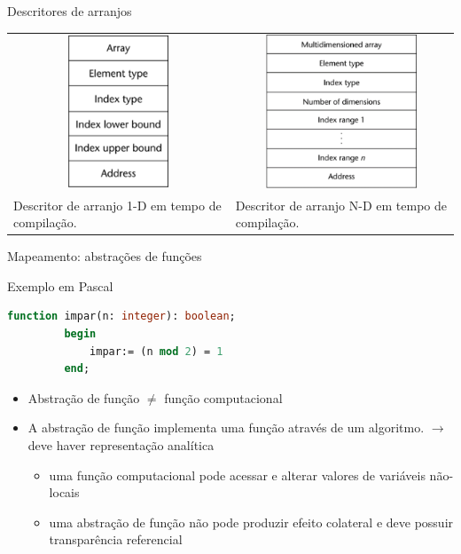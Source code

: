 \documentclass[handout]{beamer}
\begin{document}
\begin{frame}[fragile]{Descritores de arranjos}

\begin{center}
    \begin{tabular}{p{5cm}p{5cm}}
        \multicolumn{1}{c}{\includegraphics[width=3cm]{figuras/arranjo1d.pdf}}    &
        \multicolumn{1}{c}{\includegraphics[width=4.5cm]{figuras/arranjond.pdf}} \\
        Descritor de arranjo 1-D em tempo de compilação. &
        Descritor de arranjo N-D em tempo de compilação. \\
    \end{tabular}
\end{center}


\end{frame}



\begin{frame}[fragile]{Mapeamento: abstrações de funções}

\begin{block}{Exemplo em Pascal}
	\begin{lstlisting}[language=Pascal,numbers=none]
         function impar(n: integer): boolean;
         begin
             impar:= (n mod 2) = 1
         end;
  \end{lstlisting}
\end{block}

\begin{itemize}
    \item Abstração de função $\neq$ função computacional
    \item A abstração de função implementa uma função através de um algoritmo. $\rightarrow$ deve haver representação analítica
		\begin{itemize}
       \item uma função computacional pode acessar e alterar valores de variáveis não-locais
			 \item uma abstração de função não pode produzir efeito colateral e deve possuir transparência referencial
		\end{itemize}
  \end{itemize}
\end{frame}
\end{document}

